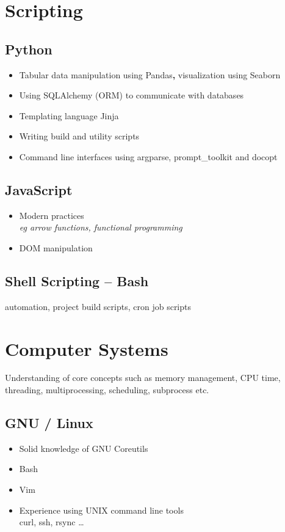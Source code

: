 \documentclass[a4paper, 13pt, draft]{article}
\newcommand{\proglang}[1]{%
    \subsection*{#1}
}
\begin{document}
\begin{multicols}{2}

    \section*{\color{col1} \Large{Scripting} \color{default}}

    \proglang{Python}

    \begin{itemize}
	\setlength\itemsep{0em}
    \item
	Tabular data manipulation using Pandas\textbf{,} visualization using
	Seaborn
    \item
	Using SQLAlchemy (ORM) to communicate with databases
    \item
	Templating language Jinja
    \item
	Writing build and utility scripts
    \item
	Command line interfaces using argparse, prompt\_toolkit and docopt
\end{itemize}

\proglang{JavaScript} 

\begin{itemize}
    \setlength\itemsep{0em}
\item Modern practices \\ 
    \textit{eg arrow functions, functional programming}
\item DOM manipulation 
\end{itemize}

\proglang{Shell Scripting -- Bash}

automation, project build scripts, cron job scripts

\section*{\color{col1} \Large{Computer Systems} \color{default}}

Understanding of core concepts such as memory management, CPU time,
threading, multiprocessing, scheduling, subprocess etc.

\subsection*{GNU / Linux}
\begin{itemize}
    \setlength\itemsep{0em}
\item Solid knowledge of GNU Coreutils
\item Bash
\item Vim
\item Experience using UNIX command line tools \\
    curl, ssh, rsync \dots
\end{itemize}


\end{multicols}
\end{document}
